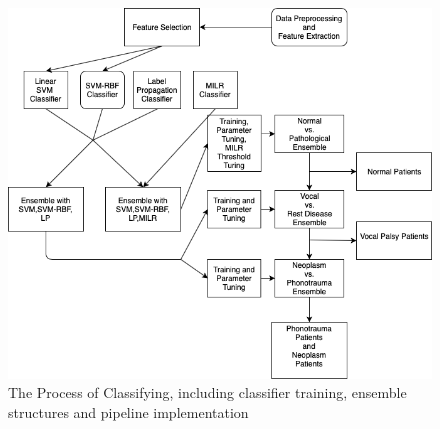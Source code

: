 	\begin{figure}[!htbp]
		\begin{center}
			\includegraphics[scale=0.35]{Diagram_3.png}
		\end{center}
		\caption{The Process of Classifying, including classifier training, ensemble structures and pipeline implementation}
		\label{fig:pipeline}
	\end{figure}




